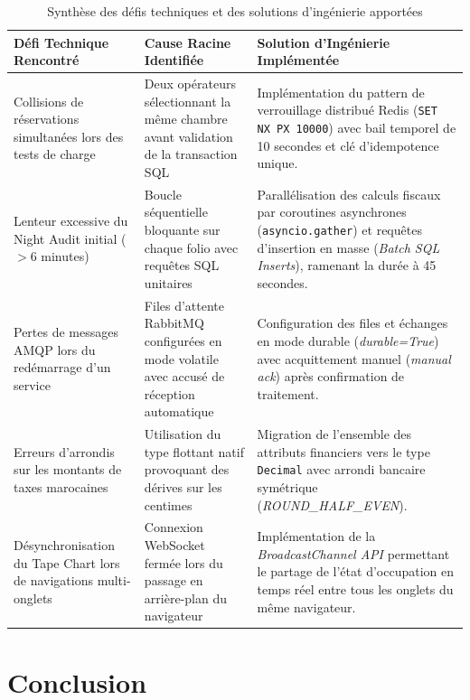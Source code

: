 \documentclass[12pt,a4paper,oneside]{report}
\begin{document}
\begin{table}[H]
\centering
\small
\renewcommand{\arraystretch}{1.3}
\begin{tabularx}{\textwidth}{|p{3.5cm}|p{3.8cm}|X|}
\hline
\textbf{Défi Technique Rencontré} & \textbf{Cause Racine Identifiée} & \textbf{Solution d'Ingénierie Implémentée} \\
\hline
Collisions de réservations simultanées lors des tests de charge & Deux opérateurs sélectionnant la même chambre avant validation de la transaction SQL & Implémentation du pattern de verrouillage distribué Redis (\texttt{SET NX PX 10000}) avec bail temporel de 10 secondes et clé d'idempotence unique. \\
\hline
Lenteur excessive du Night Audit initial ($> 6$ minutes) & Boucle séquentielle bloquante sur chaque folio avec requêtes SQL unitaires & Parallélisation des calculs fiscaux par coroutines asynchrones (\texttt{asyncio.gather}) et requêtes d'insertion en masse (\textit{Batch SQL Inserts}), ramenant la durée à 45 secondes. \\
\hline
Pertes de messages AMQP lors du redémarrage d'un service & Files d'attente RabbitMQ configurées en mode volatile avec accusé de réception automatique & Configuration des files et échanges en mode durable (\textit{durable=True}) avec acquittement manuel (\textit{manual ack}) après confirmation de traitement. \\
\hline
Erreurs d'arrondis sur les montants de taxes marocaines & Utilisation du type flottant natif provoquant des dérives sur les centimes & Migration de l'ensemble des attributs financiers vers le type \texttt{Decimal} avec arrondi bancaire symétrique (\textit{ROUND\_HALF\_EVEN}). \\
\hline
Désynchronisation du Tape Chart lors de navigations multi-onglets & Connexion WebSocket fermée lors du passage en arrière-plan du navigateur & Implémentation de la \textit{BroadcastChannel API} permettant le partage de l'état d'occupation en temps réel entre tous les onglets du même navigateur. \\
\hline
\end{tabularx}
\caption{Synthèse des défis techniques et des solutions d'ingénierie apportées}
\label{tab:defis_solutions}
\end{table}

\section{Conclusion}
\end{document}
